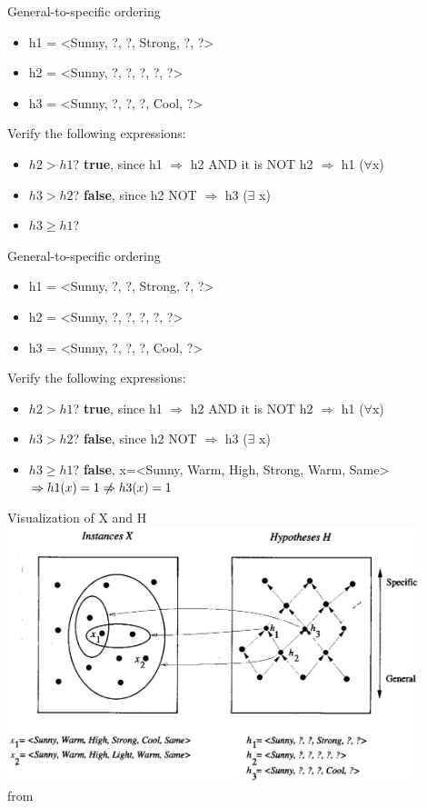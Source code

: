 \documentclass{beamer}
\begin{document}
\begin{frame}{General-to-specific ordering}
\begin{itemize}
\item h1 = <Sunny, ?, ?, Strong, ?, ?>
\item h2 = <Sunny, ?, ?, ?, ?, ?>
\item h3 = <Sunny, ?, ?, ?, Cool, ?>
\end{itemize}

Verify the following expressions:
\begin{itemize}
\item $h2 > h1$? \textbf{true}, since h1 $\Rightarrow$ h2 AND it is NOT h2 $\Rightarrow$ h1 ($\forall $x)
\item $h3 > h2$? \textbf{false}, since h2 NOT $\Rightarrow$ h3 ($\exists$ x)
\item $h3 \geq h1$? 
\end{itemize}
\end{frame}

\begin{frame}{General-to-specific ordering}
\begin{itemize}
\item h1 = <Sunny, ?, ?, Strong, ?, ?>
\item h2 = <Sunny, ?, ?, ?, ?, ?>
\item h3 = <Sunny, ?, ?, ?, Cool, ?>
\end{itemize}

Verify the following expressions:
\begin{itemize}
\item $h2 > h1$? \textbf{true}, since h1 $\Rightarrow$ h2 AND it is NOT h2 $\Rightarrow$ h1 ($\forall $x)
\item $h3 > h2$? \textbf{false}, since h2 NOT $\Rightarrow$ h3 ($\exists$ x)
\item $h3 \geq h1$? \textbf{false}, x=<Sunny, Warm, High, Strong, Warm, Same> $\Rightarrow h1(x)=1 \centernot \Rightarrow h3(x)=1$
\end{itemize}
\end{frame}

\begin{frame}{Visualization of X and H}
\centering
\includegraphics[width=0.9\textwidth]{X_and_H}
\\from \cite{mitchell1997a}
\end{frame}
\end{document}
